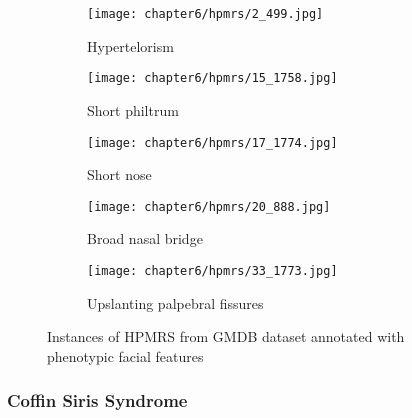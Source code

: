 \documentclass[../report.tex]{subfiles}
\begin{document}
	 \begin{figure}[H]\label{fig_hpmrs}
	 	\centering
	 	\begin{subfigure}[t]{0.17\textwidth}
	 		\centering
	 		\texttt{[image: chapter6/hpmrs/2\_499.jpg]}
	 		\caption{Hypertelorism}
	 	\end{subfigure}
	 	\begin{subfigure}[t]{0.17\textwidth}
	 		\centering
	 		\texttt{[image: chapter6/hpmrs/15\_1758.jpg]}
	 		\caption{Short philtrum}
	 	\end{subfigure}	
	 	\begin{subfigure}[t]{0.17\textwidth}
	 		\centering
	 		\texttt{[image: chapter6/hpmrs/17\_1774.jpg]}
			\caption{Short nose}
	 	\end{subfigure}	
	 	\begin{subfigure}[t]{0.17\textwidth}
	 		\centering
	 		\texttt{[image: chapter6/hpmrs/20\_888.jpg]}
	 		\caption{Broad nasal bridge}
	 	\end{subfigure}	
	 	\begin{subfigure}[t]{0.17\textwidth}
	 		\centering
	 		\texttt{[image: chapter6/hpmrs/33\_1773.jpg]}
	 		\caption{Upslanting palpebral fissures}
	 	\end{subfigure}	
	 	\caption[Instances of HPMRS from GMDB dataset]{Instances of HPMRS from GMDB dataset annotated with phenotypic facial features}
	 \end{figure}
	 
	 	\subsubsection{Coffin Siris Syndrome}
	 
\end{document}
